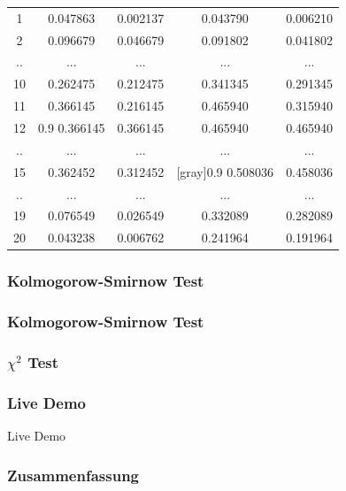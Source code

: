 \documentclass{beamer}
\begin{document}
\begin{frame}
\begin{itemize}
\begin{table}[ht]
\begin{tabular}{c|c|c|c|c}
\hline
1	&	0.047863	&	0.002137	&	0.043790	&	0.006210	\\
2	&	0.096679	&	0.046679	&	0.091802	&	0.041802	\\
..	&	...		&	...		&	...		&	...		\\
10	&	0.262475	&	0.212475	&	0.341345	&	0.291345	\\
11	&	0.366145	&	0.216145	&	0.465940	&	0.315940	\\
12	&{0.9}	0.366145	&	0.366145	&	0.465940	&	0.465940	\\
..	&	...		&	...		&	...		&	...		\\
15	&	0.362452	&	0.312452	&[gray]{0.9}	0.508036	&	0.458036	\\
..	&	...		&	...		&	...		&	...		\\
19	&	0.076549	&	0.026549	&	0.332089	&	0.282089	\\
20	&	0.043238	&	0.006762	&	0.241964	&	0.191964	\\
\end{tabular}
\end{table}


	\end{itemize}
\end{frame}
\begin{frame}
\frametitle{Kolmogorow-Smirnow Test}
\end{frame}
\begin{frame}
\frametitle{Kolmogorow-Smirnow Test}
\end{frame}

\begin{frame}
\frametitle{$\chi^2$ Test}
\end{frame}

\begin{frame}
\frametitle{Live Demo}
\center
\Huge Live Demo
\end{frame}

\begin{frame}
\frametitle{Zusammenfassung}
\end{frame}
\end{document}
